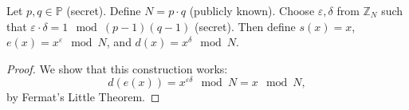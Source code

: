\begin{example}
    Let $p, q \in \mathbb{P}$ (secret).
    Define $N = p \cdot q$ (publicly known).
    Choose $\varepsilon, \delta$ from $\mathbb{Z}_N$ such that $\varepsilon \cdot \delta = 1 \mod (p - 1)(q - 1)$ (secret).
    Then define $s(x) = x$, $e(x) = x^{\varepsilon} \mod N$, and $d(x) = x^{\delta} \mod N$.
\end{example}

\begin{proof}
    We show that this construction works:
    \[
        d(e(x)) = x^{\varepsilon \delta} \mod N = x \mod N,
    \]
    by Fermat's Little Theorem.
\end{proof}
